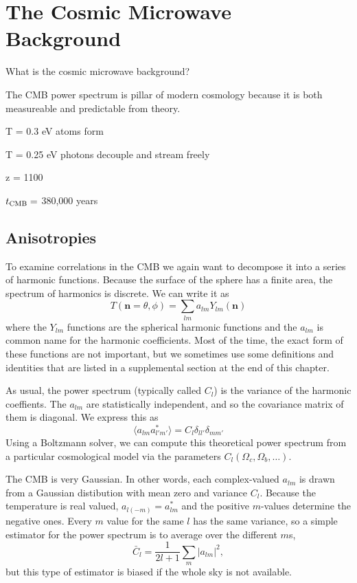 \chapter{The Cosmic Microwave Background}

What is the cosmic microwave background?

The CMB power spectrum is pillar of modern cosmology because it is both measureable and predictable from theory.

T = 0.3 eV atoms form

T = 0.25 eV photons decouple and stream freely

z = 1100

$t_{\rm CMB} = $ 380,000 years


\section{Anisotropies}
To examine correlations in the CMB we again want to decompose it into a series of harmonic functions.  Because the surface of the sphere has a finite area, the spectrum of harmonics is discrete.  We can write it as
\begin{equation}
  T(\mathbf{n} = \theta,\phi) = \sum_{lm} a_{lm} Y_{lm}(\mathbf{n})
\end{equation}
where the $Y_{lm}$ functions are the spherical harmonic functions and the $a_{lm}$ is common name for the harmonic coefficients.  Most of the time, the exact form of these functions are not important, but we sometimes use some definitions and identities that are listed in a supplemental section at the end of this chapter.

As usual, the power spectrum (typically called $C_l$) is the variance of the harmonic coeffients.  The $a_{lm}$ are statistically independent, and so the covariance matrix of them is diagonal.  We express this as
\begin{equation}
  \langle a_{lm} a_{l'm'}^* \rangle = C_l \delta_{ll'} \delta_{mm'}
\end{equation}
Using a Boltzmann solver, we can compute this theoretical power spectrum from a particular cosmological model via the parameters $C_l(\Omega_c,\Omega_b,\dots)$.  

The CMB is very Gaussian.  In other words, each complex-valued $a_{lm}$ is drawn from a Gaussian distibution with mean zero and variance $C_l$.  Because the temperature is real valued,  $a_{l(-m)} = a_{lm}^*$ and the positive $m$-values determine the negative ones. Every $m$ value for the same $l$ has the same variance, so a simple estimator for the power spectrum is to average over the different $m$s,
\begin{equation}
  \bar C_l = \frac{1}{2l+1} \sum_m |a_{lm}|^2,
\end{equation}
but this type of estimator is biased if the whole sky is not available.

